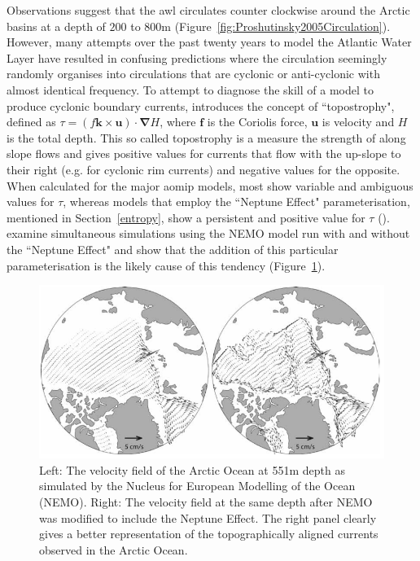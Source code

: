 \documentclass[12pt,a4paper]{report}
\newcommand*\figref[1]{Figure~\ref{#1}}
\newcommand*\secref[1]{Section~\ref{#1}}
\begin{document}
Observations suggest that the \gls{awl} circulates counter clockwise around the
 Arctic basins at a depth of $200$ to $800\mathrm{m}$
 (\figref{fig:Proshutinsky2005Circulation}). However, many attempts over the past twenty
 years to model the Atlantic Water Layer have resulted in confusing predictions where the
 circulation seemingly randomly organises into circulations that are cyclonic or
 anti-cyclonic with almost identical frequency. To attempt to diagnose the skill of a model
 to produce cyclonic boundary currents, \cite{holloway2007water} introduces the concept of ``topostrophy",
 defined as   $\tau=(f\boldsymbol{k}\times\boldsymbol{u})\cdot\boldsymbol{\nabla}H$, where
 $\boldsymbol{f}$  is the Coriolis force,  $\boldsymbol{u}$ is velocity and  $H$ is the total depth. 
 This so called topostrophy is a measure the strength of along slope flows and gives
 positive values for currents that flow with the up-slope to their right (e.g. for cyclonic
 rim currents) and negative values for the opposite.  When calculated for the major
 \gls{aomip} models, most show variable and ambiguous values for $\tau$,  whereas models that
 employ the ``Neptune Effect" parameterisation, mentioned in \secref{entropy}, show a persistent and positive
 value for  $\tau$ (\cite{proshutinsky2011recent}). \cite{holloway2009representing} examine
 simultaneous simulations using the NEMO model run with and without the ``Neptune Effect" and
 show that the addition of this particular parameterisation is the likely cause of this
 tendency (\figref{fig:HolloWang2009}).  


\begin{figure}
	\centering
	\includegraphics[width=\linewidth]{HolloWang2009}
	\caption[\cite{holloway2009representing}]{Left: The velocity field of the Arctic Ocean at 551m depth as simulated by the Nucleus for European Modelling of the Ocean (NEMO). Right: The velocity field at the same depth after NEMO was modified to include the Neptune Effect. The right panel clearly gives a better representation of the topographically aligned currents observed in the Arctic Ocean.  \cite{holloway2009representing}}
	\label{fig:HolloWang2009}
\end{figure}
\end{document}
